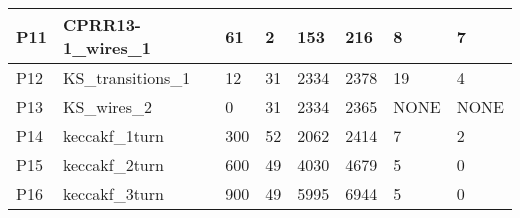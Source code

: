 \documentclass[pagesize, english, fontsize=10pt, DIV=25]{scrartcl}
\begin{document}
\begin{table}[]
{\begin{tabular}{|l|l|l|l|l|l|l|l|}
P11             & CPRR13-1\_wires\_1                            & 61                                                      & 2                                                            & 153                                                & 216                                                            & 8                                                               & 7                                                                   \\ \hline
P12             & KS\_transitions\_1                            & 12                                                      & 31                                                           & 2334                                               & 2378                                                           & 19                                                              & 4                                                                   \\ \hline
P13             & KS\_wires\_2                                  & 0                                                       & 31                                                           & 2334                                               & 2365                                                           & NONE                                                             & NONE                                                                   \\ \hline
P14             & keccakf\_1turn                                & 300                                                     & 52                                                           & 2062                                               & 2414                                                           & 7                                                               & 2                                                                   \\ \hline
P15             & keccakf\_2turn                                & 600                                                     & 49                                                           & 4030                                               & 4679                                                           & 5                                                               & 0                                                                   \\ \hline
P16             & keccakf\_3turn                                & 900                                                     & 49                                                           & 5995                                               & 6944                                                           & 5                                                               & 0                                                                   \\ \hline

\end{tabular}}
\end{table}
\end{document}
